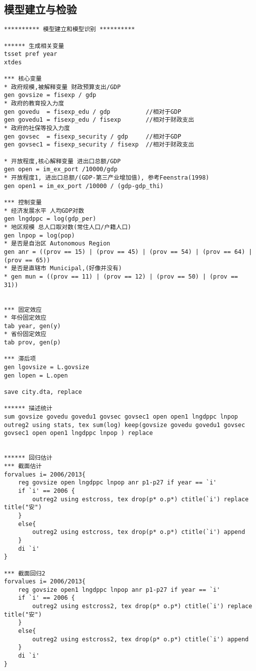 \clearpage
\subsection{模型建立与检验}
\begin{framed}
\begin{verbatim}
********** 模型建立和模型识别 **********

****** 生成相关变量
tsset pref year
xtdes

*** 核心变量
* 政府规模,被解释变量 财政预算支出/GDP
gen govsize	= fisexp / gdp
* 政府的教育投入力度
gen govedu  = fisexp_edu / gdp			//相对于GDP
gen govedu1 = fisexp_edu / fisexp		//相对于财政支出
* 政府的社保等投入力度
gen govsec  = fisexp_security / gdp		//相对于GDP
gen govsec1 = fisexp_security / fisexp	//相对于财政支出

* 开放程度,核心解释变量 进出口总额/GDP
gen	open = im_ex_port /10000/gdp
* 开放程度1, 进出口总额/(GDP-第三产业增加值), 参考Feenstra(1998)
gen open1 = im_ex_port /10000 / (gdp-gdp_thi)

*** 控制变量
* 经济发展水平 人均GDP对数
gen lngdppc = log(gdp_per)
* 地区规模 总人口取对数(常住人口/户籍人口)
gen lnpop = log(pop)
* 是否是自治区 Autonomous Region
gen anr = ((prov == 15) | (prov == 45) | (prov == 54) | (prov == 64) | (prov == 65))
* 是否是直辖市 Municipal,(好像并没有)
* gen mun = ((prov == 11) | (prov == 12) | (prov == 50) | (prov == 31))


*** 固定效应
* 年份固定效应
tab year, gen(y)
* 省份固定效应
tab prov, gen(p)

*** 滞后项
gen lgovsize = L.govsize
gen lopen = L.open

save city.dta, replace

****** 描述统计
sum govsize govedu govedu1 govsec govsec1 open open1 lngdppc lnpop
outreg2 using stats, tex sum(log) keep(govsize govedu govedu1 govsec govsec1 open open1 lngdppc lnpop ) replace


****** 回归估计
*** 截面估计
forvalues i= 2006/2013{
	reg govsize open lngdppc lnpop anr p1-p27 if year == `i'
	if `i' == 2006 {
		outreg2 using estcross, tex drop(p* o.p*) ctitle(`i') replace title("安")
	}
	else{
		outreg2 using estcross, tex drop(p* o.p*) ctitle(`i') append
	}
	di `i'
}

*** 截面回归2
forvalues i= 2006/2013{
	reg govsize open1 lngdppc lnpop anr p1-p27 if year == `i'
	if `i' == 2006 {
		outreg2 using estcross2, tex drop(p* o.p*) ctitle(`i') replace title("安")
	}
	else{
		outreg2 using estcross2, tex drop(p* o.p*) ctitle(`i') append
	}
	di `i'
}


\end{verbatim}
\end{framed}
